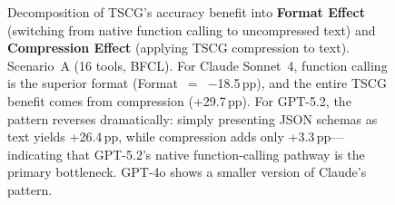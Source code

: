 \begin{figure}[t]
\caption{Decomposition of TSCG's accuracy benefit into \textbf{Format Effect} (switching from native function calling to uncompressed text) and \textbf{Compression Effect} (applying TSCG compression to text). Scenario~A (16 tools, BFCL). For Claude Sonnet~4, function calling is the superior format (Format~$=$~$-$18.5\,pp), and the entire TSCG benefit comes from compression ({+}29.7\,pp). For GPT-5.2, the pattern reverses dramatically: simply presenting JSON schemas as text yields {+}26.4\,pp, while compression adds only {+}3.3\,pp---indicating that GPT-5.2's native function-calling pathway is the primary bottleneck. GPT-4o shows a smaller version of Claude's pattern.}
\label{fig:format-decomposition}
\end{figure}

